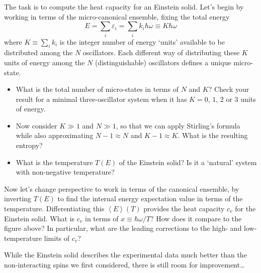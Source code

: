 \documentclass[12 pt]{article} %
\newcommand{\eps}{\ensuremath{\varepsilon} }
\newcommand{\om}{\ensuremath{\omega} }
\newcommand{\vev}[1]{\ensuremath{\left\langle #1 \right\rangle} }
\begin{document}
The task is to compute the heat capacity for an Einstein solid.
Let's begin by working in terms of the micro-canonical ensemble, fixing the total energy
\begin{equation*}
  E = \sum_i \eps_i = \sum_i k_i\hbar\om \equiv K\hbar\om
\end{equation*}
where $K \equiv \sum_i k_i$ is the integer number of energy `units' available to be distributed among the $N$ oscillators.
Each different way of distributing these $K$ units of energy among the $N$ (distinguishable) oscillators defines a unique micro-state. \\[-24 pt]
\begin{itemize}
  \item What is the total number of micro-states in terms of $N$ and $K$?
        Check your result for a minimal three-oscillator system when it has $K = 0$, $1$, $2$ or $3$ units of energy.

  \item Now consider $K \gg 1$ and $N \gg 1$, so that we can apply Stirling's formula while also approximating $N - 1 \approx N$ and $K - 1 \approx K$.
        What is the resulting entropy?

  \item What is the temperature $T(E)$ of the Einstein solid?
        Is it a `natural' system with non-negative temperature?
\end{itemize}

Now let's change perspective to work in terms of the canonical ensemble, by inverting $T(E)$ to find the internal energy expectation value in terms of the temperature.
Differentiating this $\vev{E}\!(T)$ provides the heat capacity $c_v$ for the Einstein solid.
What is $c_v$ in terms of $x \equiv \hbar \om / T$?
How does it compare to the figure above?
In particular, what are the leading corrections to the high- and low-temperature limits of $c_v$?

While the Einstein solid describes the experimental data much better than the non-interacting spins we first considered, there is still room for improvement\dots
\end{document}
